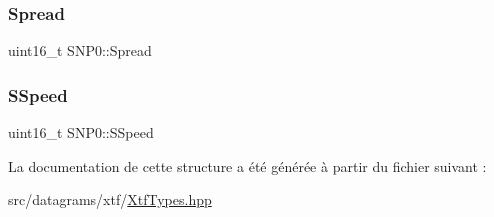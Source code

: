 \subsubsection{\texorpdfstring{Spread}{Spread}}
{\footnotesize\ttfamily uint16\+\_\+t S\+N\+P0\+::\+Spread}

\mbox{\label{structSNP0_a34acd7f87f72ec98e040260e54fac986}} 
\subsubsection{\texorpdfstring{S\+Speed}{SSpeed}}
{\footnotesize\ttfamily uint16\+\_\+t S\+N\+P0\+::\+S\+Speed}



La documentation de cette structure a été générée à partir du fichier suivant \+:\begin{DoxyCompactItemize}
\item 
src/datagrams/xtf/\hyperlink{XtfTypes_8hpp}{Xtf\+Types.\+hpp}\end{DoxyCompactItemize}
